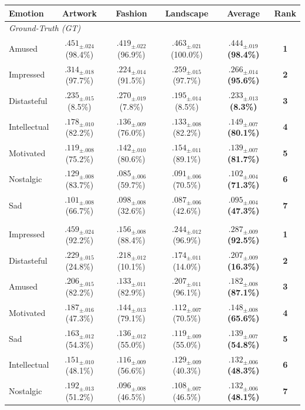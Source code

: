 \begin{tabular}{l cccc c}
\toprule
Emotion & Artwork & Fashion & Landscape & Average & Rank \\
\midrule
\multicolumn{6}{l}{\textit{Ground-Truth (GT)}}\\
Amused       & $.451_{\pm .024}$ (98.4\%) & $.419_{\pm .022}$ (96.9\%) & $.463_{\pm .021}$ (100.0\%) & \textbf{$.444_{\pm .019}$ (98.4\%)} & \textbf{1} \\
Impressed    & $.314_{\pm .018}$ (97.7\%) & $.224_{\pm .014}$ (91.5\%) & $.259_{\pm .015}$ (97.7\%) & \textbf{$.266_{\pm .014}$ (95.6\%)} & \textbf{2} \\
Distasteful  & $.235_{\pm .015}$ (8.5\%) & $.270_{\pm .019}$ (7.8\%) & $.195_{\pm .014}$ (8.5\%) & \textbf{$.233_{\pm .013}$ (8.3\%)} & \textbf{3} \\
Intellectual & $.178_{\pm .010}$ (82.2\%) & $.136_{\pm .009}$ (76.0\%) & $.133_{\pm .008}$ (82.2\%) & \textbf{$.149_{\pm .007}$ (80.1\%)} & \textbf{4} \\
Motivated    & $.119_{\pm .008}$ (75.2\%) & $.142_{\pm .010}$ (80.6\%) & $.154_{\pm .011}$ (89.1\%) & \textbf{$.139_{\pm .007}$ (81.7\%)} & \textbf{5} \\
Nostalgic    & $.129_{\pm .008}$ (83.7\%) & $.085_{\pm .006}$ (59.7\%) & $.091_{\pm .006}$ (70.5\%) & \textbf{$.102_{\pm .004}$ (71.3\%)} & \textbf{6} \\
Sad          & $.101_{\pm .008}$ (66.7\%) & $.098_{\pm .008}$ (32.6\%) & $.087_{\pm .006}$ (42.6\%) & \textbf{$.095_{\pm .004}$ (47.3\%)} & \textbf{7} \\
\addlinespace
\multicolumn{6}{l}{\textit{Predicted (Pred)}}\\
Impressed    & $.459_{\pm .024}$ (92.2\%) & $.156_{\pm .008}$ (88.4\%) & $.244_{\pm .012}$ (96.9\%) & \textbf{$.287_{\pm .009}$ (92.5\%)} & \textbf{1} \\
Distasteful  & $.229_{\pm .015}$ (24.8\%) & $.218_{\pm .012}$ (10.1\%) & $.174_{\pm .011}$ (14.0\%) & \textbf{$.207_{\pm .009}$ (16.3\%)} & \textbf{2} \\
Amused       & $.206_{\pm .015}$ (82.2\%) & $.133_{\pm .011}$ (82.9\%) & $.207_{\pm .011}$ (96.1\%) & \textbf{$.182_{\pm .008}$ (87.1\%)} & \textbf{3} \\
Motivated    & $.187_{\pm .016}$ (47.3\%) & $.144_{\pm .013}$ (79.1\%) & $.112_{\pm .007}$ (70.5\%) & \textbf{$.148_{\pm .008}$ (65.6\%)} & \textbf{4} \\
Sad          & $.163_{\pm .012}$ (54.3\%) & $.136_{\pm .012}$ (55.0\%) & $.119_{\pm .009}$ (55.0\%) & \textbf{$.139_{\pm .007}$ (54.8\%)} & \textbf{5} \\
Intellectual & $.151_{\pm .010}$ (48.1\%) & $.116_{\pm .009}$ (56.6\%) & $.129_{\pm .009}$ (40.3\%) & \textbf{$.132_{\pm .006}$ (48.3\%)} & \textbf{6} \\
Nostalgic    & $.192_{\pm .013}$ (51.2\%) & $.096_{\pm .008}$ (46.5\%) & $.108_{\pm .007}$ (46.5\%) & \textbf{$.132_{\pm .006}$ (48.1\%)} & \textbf{7} \\
\bottomrule
\end{tabular}
